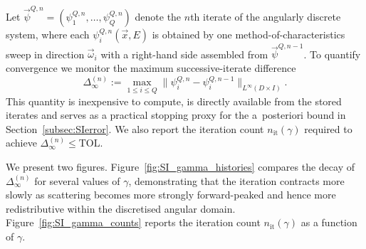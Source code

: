 \documentclass[final]{amsart}
\begin{document}
Let $\vec\psi^{ Q,n}=(\psi^{Q,n}_1,\dots,\psi^{Q,n}_Q)$
denote the $n$th iterate of the angularly discrete system, where each
$\psi^{Q,n}_i(\vec{x},E)$ is obtained by one method-of-characteristics
sweep in direction $\vec\omega_i$ with a right-hand side assembled from
$\vec\psi^{ Q,n-1}$. To quantify convergence we monitor the maximum
successive-iterate difference
\begin{equation}
  \label{eq:SI_diff_inf_exp5}
  \Delta_\infty^{(n)}
  :=
  \max_{1\le i\le Q} 
  \|\psi_i^{Q,n}-\psi_i^{Q,n-1}\|_{L^\infty(D\times I)}.
\end{equation}
This quantity is inexpensive to compute, is directly available from the
stored iterates and serves as a practical stopping proxy for the
a~posteriori bound in Section~\ref{subsec:SIerror}. We also report the
iteration count $n_{\mathrm{it}}(\gamma)$ required to achieve
$\Delta_\infty^{(n)}\le\mathrm{TOL}$.

We present two figures. Figure~\ref{fig:SI_gamma_histories} compares
the decay of $\Delta_\infty^{(n)}$ for several values of $\gamma$,
demonstrating that the iteration contracts more slowly as scattering
becomes more strongly forward-peaked and hence more redistributive
within the discretised angular
domain. Figure~\ref{fig:SI_gamma_counts} reports the iteration count
$n_{\mathrm{it}}(\gamma)$ as a function of $\gamma$.
\end{document}
